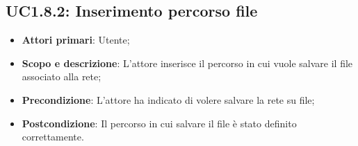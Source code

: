 \subsection{UC1.8.2: Inserimento percorso file} 
\begin{itemize} 
	\item{\textbf{Attori primari}: Utente;} 
	\item{\textbf{Scopo e descrizione}: L'attore inserisce il percorso in cui vuole salvare il file associato alla rete;} 
	\item{\textbf{Precondizione}: L'attore ha indicato di volere salvare la rete su file;} 
	\item{\textbf{Postcondizione}: Il percorso in cui salvare il file è stato definito correttamente.} 
\end{itemize} 

